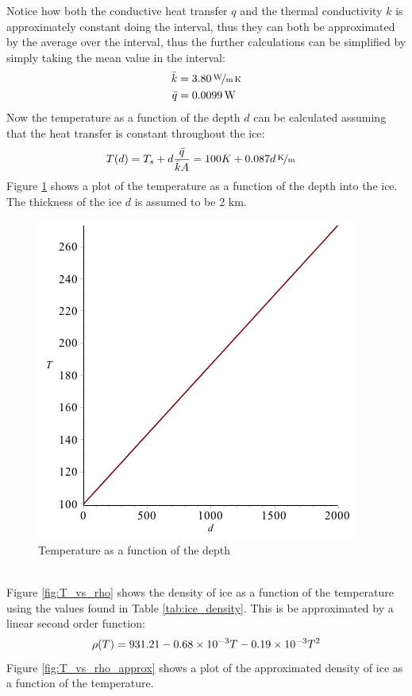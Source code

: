 Notice how both the conductive heat transfer $q$ and the thermal conductivity $k$ is approximately constant doing the interval, thus they can both be approximated by the average over the interval, thus the further calculations can be simplified by simply taking the mean value in the interval:
\begin{align}
	\bar{k} &= \unitfrac[3.80]{W}{m \, K} \\
	\bar{q} &= \unit[0.0099]{W}
\end{align}
Now the temperature as a function of the depth $d$ can be calculated assuming that the heat transfer is constant throughout the ice:
\begin{align}\label{eq:T_d}
	T(d) &= T_s + d \frac{\bar{q}}{\bar{k} A} = 100 K + \unitfrac[0.087 d]{K}{m}
\end{align}
Figure \ref{fig:d_vs_T} shows a plot of the temperature as a function of the depth into the ice. The thickness of the ice $d$ is assumed to be 2 km.
\begin{figure}[htb]
	\centering
	\includegraphics[width=.48\textwidth]{figures/temperature/d_vs_T}
	\caption{Temperature as a function of the depth}
	\label{fig:d_vs_T}
\end{figure}
\\
Figure \ref{fig:T_vs_rho} shows the density of ice as a function of the temperature using the values found in Table \ref{tab:ice_density}. This is be approximated by a linear second order function:
\begin{equation}\label{eq:rho_approx}
	\rho(T) = 931.21 - 0.68 \times 10^{-3} T - 0.19 \times 10^{-3} T^2
\end{equation}
Figure \ref{fig:T_vs_rho_approx} shows a plot of the approximated density of ice as a function of the temperature.

